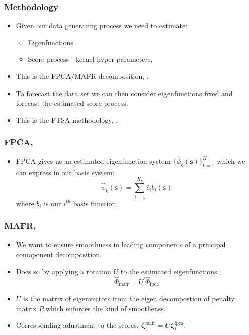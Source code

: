 \documentclass[aspectratio=169]{beamer}
\newcommand{\ve}[1]{\bm{{#1}}}
\begin{document}
  \begin{frame}
    \frametitle{Methodology}
    \begin{itemize}
      \item Given our data generating process we need to estimate:
        \begin{itemize}
          \item Eigenfunctions
          \item Score process - kernel hyper-parameters.
        \end{itemize}
      \item This is the FPCA/MAFR decomposition, \cite{ramsay_functional_2010, hooker_maximal_2016}. 
      \item To forecast the data set we can then consider eigenfunctions fixed and forecast the estimated score process. 
      \item This is the FTSA methodology, \cite{shang_ftsa_2013}.
    \end{itemize}
  \end{frame}

  \begin{frame}
    \frametitle{FPCA, \cite{ramsay_functional_2010}}
      \begin{itemize}
        \item FPCA gives us an estimated eigenfunction system $\{\hat{\phi}_k(\ve{s})\}_{k=1}^K$ which we can express in our basis system:
          \begin{equation}
            \hat{\phi}_k(\ve{s}) = \sum_{i=1}^{K_b}\hat{c}_i b_i(\ve{s})
            \label{eqn:basis_ef}
          \end{equation}
          where $b_i$ is our $i^\text{th}$ basis function.
      \end{itemize}
  \end{frame}

  \begin{frame}
    \frametitle{MAFR, \cite{hooker_maximal_2016}}
      \begin{itemize}
        \item We want to ensure smoothness in leading components of a principal comoponent decomposition.
        \item Does so by applying a rotation $U$ to the estimated eigenfunctions:
          \begin{equation}
            \hat{\Phi}_\text{mafr} = U^\prime \hat{\Phi}_\text{fpca}
            \label{eqn:mafr}
          \end{equation}
        \item $U$ is the matrix of eigenvectors from the eigen decompostion of penalty matrix $P$ which enforces the kind of smoothenss. 
        \item Corresponding adustment to the scores, $\ve{\zeta}_{i}^\text{mafr} = U \ve{\zeta}_{i}^\text{fpca}$.
      \end{itemize}
  \end{frame}
\end{document}
